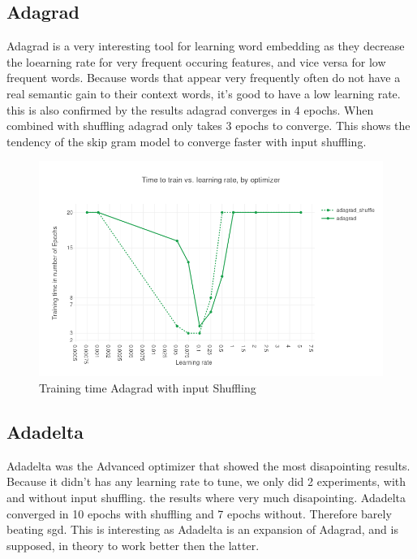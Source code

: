 \subsection{Adagrad}
Adagrad is a very interesting tool for learning word embedding as they decrease the loearning rate for very frequent occuring features, and vice versa for low frequent words. Because words that appear very frequently often do not have a real semantic gain to their context words, it's good to have a low learning rate. this is also confirmed by the results adagrad converges in 4 epochs. When combined with shuffling adagrad only takes 3 epochs to converge. This shows the tendency of the skip gram model to converge faster with input shuffling.
\begin{figure}[H]
    \centering
			\includegraphics[scale=0.45]{images/results_adagrad_shuffle} 
    \caption{Training time Adagrad with input Shuffling}
    \label{fig:results_adagrad_shuffle}
\end{figure}
\subsection{Adadelta}
Adadelta was the Advanced optimizer that showed the most disapointing results. Because it didn't has any learning rate to tune, we only did 2 experiments, with and without input shuffling. the results where very much disapointing. Adadelta converged in 10 epochs with shuffling and 7 epochs without. Therefore barely beating sgd. This is interesting as Adadelta is an expansion of Adagrad, and is supposed, in theory to work better then the latter. 
